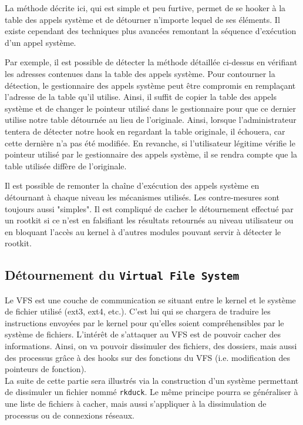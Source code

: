 \documentclass[12pt]{article}
\begin{document}
        La méthode décrite ici, qui est simple et peu furtive, permet de se hooker à la table des appels système et de détourner n'importe lequel de ses éléments. Il existe cependant des techniques plus avancées remontant la séquence d'exécution d'un appel système.

        Par exemple, il est possible de détecter la méthode détaillée ci-dessus en vérifiant les adresses contenues dans la table des appels système. Pour contourner la détection, le gestionnaire des appels système peut être compromis en remplaçant l'adresse de la table qu'il utilise. Ainsi, il suffit de copier la table des appels système et de changer le pointeur utilisé dans le gestionnaire pour que ce dernier utilise notre table détournée au lieu de l'originale. Ainsi, lorsque l'administrateur tentera de détecter notre hook en regardant la table originale, il échouera, car cette dernière n'a pas été modifiée. En revanche, si l'utilisateur légitime vérifie le pointeur utilisé par le gestionnaire des appels système, il se rendra compte que la table utilisée diffère de l'originale. 
        
        Il est possible de remonter la chaîne d'exécution des appels système en détournant à chaque niveau les mécanismes utilisés. Les contre-mesures sont toujours aussi "simples". Il est compliqué de cacher le détournement effectué par un rootkit si ce n'est en falsifiant les résultats retournés au niveau utilisateur ou en bloquant l'accès au kernel à d'autres modules pouvant servir à détecter le rootkit.

    \subsection{Détournement du \texttt{Virtual File System}}
    \label{sec:vfs}
    
        Le VFS est une couche de communication se situant entre le kernel et le système de fichier utilisé (ext3, ext4, etc.). C'est lui qui se chargera de traduire les instructions envoyées par le kernel pour qu'elles soient compréhensibles par le système de fichiers.
        L'intérêt de s'attaquer au VFS est de pouvoir cacher des informations. Ainsi, on va pouvoir dissimuler des fichiers, des dossiers, mais aussi des processus grâce à des hooks sur des fonctions du VFS (i.e. modification des pointeurs de fonction). \\

        La suite de cette partie sera illustrés via la construction d'un système permettant de dissimuler un fichier nommé \texttt{rkduck}. Le même principe pourra se généraliser à une liste de fichiers à cacher, mais aussi s'appliquer à la dissimulation de processus ou de connexions réseaux. 
\end{document}
